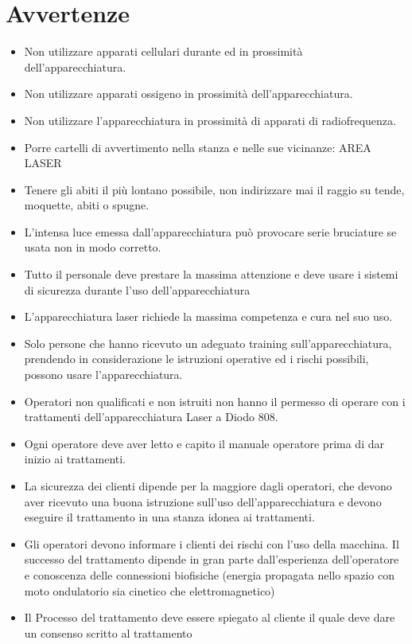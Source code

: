 \documentclass[10pt]{article}
\begin{document}
\section{Avvertenze}
\begin{itemize}
  \item Non utilizzare apparati cellulari durante ed in prossimità dell'apparecchiatura.
  \item Non utilizzare apparati ossigeno in prossimità dell'apparecchiatura.
  \item Non utilizzare l'apparecchiatura in prossimità di apparati di radiofrequenza.
  \item Porre cartelli di avvertimento nella stanza e nelle sue vicinanze: AREA LASER
  \item Tenere gli abiti il più lontano possibile, non indirizzare mai il raggio su tende, moquette, abiti o spugne.
  \item L'intensa luce emessa dall'apparecchiatura può provocare serie bruciature se usata non in modo corretto.
  \item Tutto il personale deve prestare la massima attenzione e deve usare i sistemi di sicurezza durante l'uso dell'apparecchiatura
  \item L'apparecchiatura laser richiede la massima competenza e cura nel suo uso.
  \item Solo persone che hanno ricevuto un adeguato training sull'apparecchiatura, prendendo in considerazione le istruzioni operative ed i rischi possibili, possono usare l'apparecchiatura.
  \item Operatori non qualificati e non istruiti non hanno il permesso di operare con i trattamenti dell'apparecchiatura Laser a Diodo 808.
  \item Ogni operatore deve aver letto e capito il manuale operatore prima di dar inizio ai trattamenti.
  \item La sicurezza dei clienti dipende per la maggiore dagli operatori, che devono aver ricevuto una buona istruzione sull'uso dell'apparecchiatura e devono eseguire il trattamento in una stanza idonea ai trattamenti.
  \item Gli operatori devono informare i clienti dei rischi con l'uso della macchina. Il successo del trattamento dipende in gran parte dall'esperienza dell'operatore e conoscenza delle connessioni biofisiche (energia propagata nello spazio con moto ondulatorio sia cinetico che elettromagnetico)
  \item Il Processo del trattamento deve essere spiegato al cliente il quale deve dare un consenso scritto al trattamento

\end{itemize}
\end{document}
